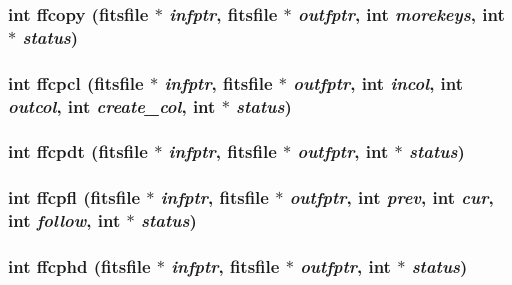 \subsubsection{\setlength{\rightskip}{0pt plus 5cm}int ffcopy (\bf{fitsfile} $\ast$ {\em infptr}, \bf{fitsfile} $\ast$ {\em outfptr}, int {\em morekeys}, int $\ast$ {\em status})}\label{src_2fitsio_8h_05f351dc381335ac165c99c10791f85d}


\subsubsection{\setlength{\rightskip}{0pt plus 5cm}int ffcpcl (\bf{fitsfile} $\ast$ {\em infptr}, \bf{fitsfile} $\ast$ {\em outfptr}, int {\em incol}, int {\em outcol}, int {\em create\_\-col}, int $\ast$ {\em status})}\label{src_2fitsio_8h_c4005499502ddc26787bf95b711a56d5}


\subsubsection{\setlength{\rightskip}{0pt plus 5cm}int ffcpdt (\bf{fitsfile} $\ast$ {\em infptr}, \bf{fitsfile} $\ast$ {\em outfptr}, int $\ast$ {\em status})}\label{src_2fitsio_8h_065331889b563986ac9c35c5b2767397}


\subsubsection{\setlength{\rightskip}{0pt plus 5cm}int ffcpfl (\bf{fitsfile} $\ast$ {\em infptr}, \bf{fitsfile} $\ast$ {\em outfptr}, int {\em prev}, int {\em cur}, int {\em follow}, int $\ast$ {\em status})}\label{src_2fitsio_8h_6b5ccd7589659b89042159ad803ded15}


\subsubsection{\setlength{\rightskip}{0pt plus 5cm}int ffcphd (\bf{fitsfile} $\ast$ {\em infptr}, \bf{fitsfile} $\ast$ {\em outfptr}, int $\ast$ {\em status})}\label{src_2fitsio_8h_fa817efdc02282f5df1032b2d1b8dbaf}


